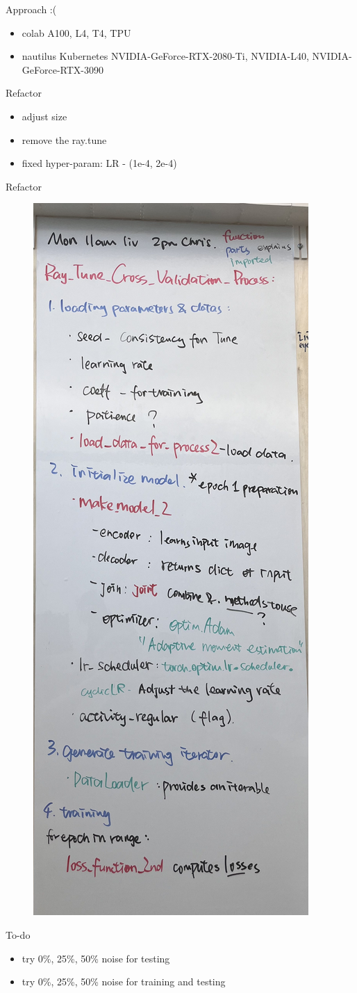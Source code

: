 \begin{frame}{Approach :(}
    \begin{itemize}
        \item colab 
              A100, L4, T4, TPU
        \item nautilus 
              Kubernetes 
              NVIDIA-GeForce-RTX-2080-Ti, NVIDIA-L40, NVIDIA-GeForce-RTX-3090
    \end{itemize}
\end{frame}

\begin{frame}{Refactor}
    \begin{itemize}
        \item
              adjust size
        \item
              remove the ray.tune
        \item
              fixed hyper-param: LR - (1e-4, 2e-4) 
    \end{itemize}
\end{frame}

\begin{frame}{Refactor}
    \begin{figure} 
        \centering
        \includegraphics[width=0.2\linewidth]{images/IMG_4668.jpeg} 
    \end{figure}
\end{frame}

\begin{frame}{To-do}
    \begin{itemize}
        \item try 0\%, 25\%, 50\% noise for testing
        \item try 0\%, 25\%, 50\% noise for training and testing
    \end{itemize}
\end{frame}

